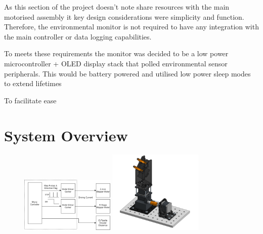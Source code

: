 As this section of the project doesn't note share resources with the main motorised assembly it key design considerations were simplicity and function.
Therefore, the environmental monitor is not required to have any integration with the main controller or data logging capabilities.

To meets these requirements the monitor was decided to be a low power microcontroller + OLED display stack that polled environmental sensor peripherals. This would be battery powered and utilised low power sleep modes to extend lifetimes

To facilitate ease

\section{System Overview}

\begin{figure}[h]
    \centering
    \includegraphics[width=0.4\textwidth]{img/ED_block_diag.png}
    \includegraphics[width=0.4\textwidth]{img/full_mech.png}
\end{figure}